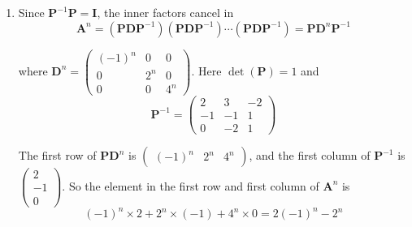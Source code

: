 \documentclass[leqno]{article}
\begin{document}
\begin{enumerate}[
  label=\textbf{\arabic*.},
  leftmargin=*,
  topsep=0pt,
  partopsep=0pt,
  parsep=0pt
]
\begin{djsSolution}
\begin{enumerate}[label=\textbf{(\alph*)}, start=1]
\(\lambda=4\):
\[
\begin{pmatrix} -8 & -13 & 8 \\ -6 & -11 & 6 \\ -12 & -22 & 12 \end{pmatrix}\begin{pmatrix}x\\y\\z\end{pmatrix}=\mathbf{0}
\]

Taking \(3\times\) the first equation minus \(4\times\) the second gives \(-39y+44y=5y=0\), so \(y=0\). The second row then gives \(-6x+6z=0\), so \(z=x\). Taking \(x=1\), an eigenvector is \(\begin{pmatrix}1\\0\\1\end{pmatrix}\).

Using the eigenvectors as the columns of \(\mathbf{P}\), in the same order as the eigenvalues on the diagonal of \(\mathbf{D}\):
\[
\mathbf{P}=\begin{pmatrix} 1 & 1 & 1 \\ 1 & 2 & 0 \\ 2 & 4 & 1 \end{pmatrix},\qquad \mathbf{D}=\begin{pmatrix} -1 & 0 & 0 \\ 0 & 2 & 0 \\ 0 & 0 & 4 \end{pmatrix}
\]

  \item Since \(\mathbf{P}^{-1}\mathbf{P}=\mathbf{I}\), the inner factors cancel in
\[
\mathbf{A}^n=(\mathbf{P}\mathbf{D}\mathbf{P}^{-1})(\mathbf{P}\mathbf{D}\mathbf{P}^{-1})\cdots(\mathbf{P}\mathbf{D}\mathbf{P}^{-1})=\mathbf{P}\mathbf{D}^n\mathbf{P}^{-1}
\]

where \(\mathbf{D}^n=\begin{pmatrix} (-1)^n & 0 & 0 \\ 0 & 2^n & 0 \\ 0 & 0 & 4^n \end{pmatrix}\). Here \(\det(\mathbf{P})=1\) and
\[
\mathbf{P}^{-1}=\begin{pmatrix} 2 & 3 & -2 \\ -1 & -1 & 1 \\ 0 & -2 & 1 \end{pmatrix}
\]

The first row of \(\mathbf{P}\mathbf{D}^n\) is \(\begin{pmatrix}(-1)^n & 2^n & 4^n\end{pmatrix}\), and the first column of \(\mathbf{P}^{-1}\) is \(\begin{pmatrix}2\\-1\\0\end{pmatrix}\). So the element in the first row and first column of \(\mathbf{A}^n\) is
\[
(-1)^n\times 2+2^n\times(-1)+4^n\times 0=2(-1)^n-2^n
\]


\end{enumerate}
\end{djsSolution}
\end{enumerate}
\end{document}
